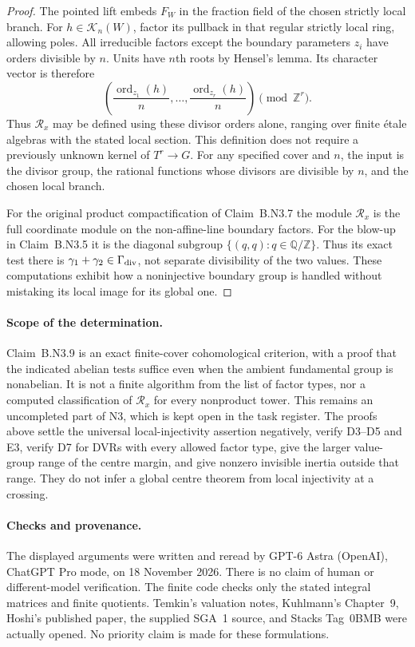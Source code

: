 \begin{proof}
The pointed lift embeds $F_W$ in the fraction field of the chosen
strictly local branch.  For $h\in\mathcal K_n(W)$, factor its
pullback in that regular strictly local ring, allowing poles.
All irreducible factors except the boundary parameters $z_i$
have orders divisible by $n$.  Units have $n$th roots by
Hensel's lemma.  Its character vector is therefore
\[
 \left(\frac{\operatorname{ord}_{z_1}(h)}n,\ldots,
       \frac{\operatorname{ord}_{z_r}(h)}n\right)
       \pmod{\mathbb Z^r}.
\]
Thus $\mathcal R_x$ may be defined using these divisor orders
alone, ranging over finite \'etale algebras with the stated local
section.  This definition does not require a previously unknown
kernel of $T^r\to G$.  For any specified cover and $n$, the input
is the divisor group, the rational functions whose divisors are
divisible by $n$, and the chosen local branch.

For the original product compactification of Claim~B.N3.7 the module
$\mathcal R_x$ is the full coordinate module on the non-affine-line
boundary factors.  For the blow-up in Claim~B.N3.5 it is the
diagonal subgroup $\{(q,q):q\in\mathbb Q/\mathbb Z\}$.
Thus its exact test there is
$\gamma_1+\gamma_2\in\Gamma_{\rm div}$, not separate
divisibility of the two values.  These computations exhibit how a
noninjective boundary group is handled without mistaking its local
image for its global one.
\end{proof}

\paragraph{Scope of the determination.}
Claim~B.N3.9 is an exact finite-cover cohomological criterion, with a
proof that the indicated abelian tests suffice even when the ambient
fundamental group is nonabelian.  It is not a finite algorithm from
the list of factor types, nor a computed classification of
$\mathcal R_x$ for every nonproduct tower.  This remains an
uncompleted part of N3, which is kept open in the task register.
The proofs above settle
the universal local-injectivity assertion negatively, verify D3--D5
and E3, verify D7 for DVRs with every allowed factor type, give the
larger value-group range of the centre margin, and give nonzero
invisible inertia outside that range.  They do not infer a global
centre theorem from local injectivity at a crossing.

\paragraph{Checks and provenance.}
The displayed arguments were written and reread by GPT-6 Astra
(OpenAI), ChatGPT Pro mode, on 18 November 2026.  There is no claim
of human or different-model verification.  The finite code checks
only the stated integral matrices and finite quotients.  Temkin's
valuation notes, Kuhlmann's Chapter~9, Hoshi's published paper,
the supplied SGA~1 source, and Stacks Tag~0BMB were actually opened.
No priority claim is made for these formulations.

